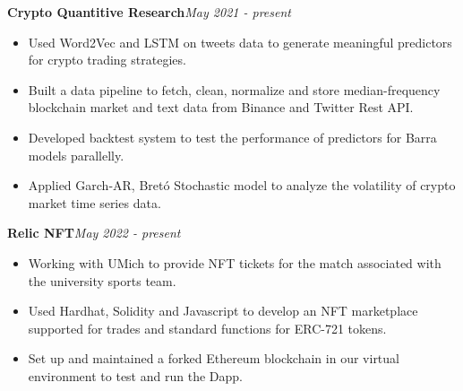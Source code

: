 \documentclass[10pt,a4paper]{article}
\begin{document}
\textbf{Crypto Quantitive Research}\hfill \emph{May 2021 - present}
\begin{itemize}[noitemsep,topsep=0pt]
    \item Used Word2Vec and LSTM on tweets data to generate meaningful predictors for crypto trading strategies.
    \item Built a data pipeline to fetch, clean, normalize and store median-frequency blockchain market and text data from Binance and Twitter Rest API.
    \item Developed backtest system to test the performance of predictors for Barra models parallelly.
    \item Applied Garch-AR, Bretó Stochastic model to analyze the volatility of crypto market time series data.
\end{itemize}
\textbf{Relic NFT}\hfill\emph{May 2022 - present}
\begin{itemize}[noitemsep,topsep=0pt]
    \item Working with UMich to provide NFT tickets for the match associated with the university sports team.
    \item Used Hardhat, Solidity and Javascript to develop an NFT marketplace supported for trades and standard functions for ERC-721 tokens.
    \item Set up and maintained a forked Ethereum blockchain in our virtual environment to test and run the Dapp.
\end{itemize}
\end{document}
